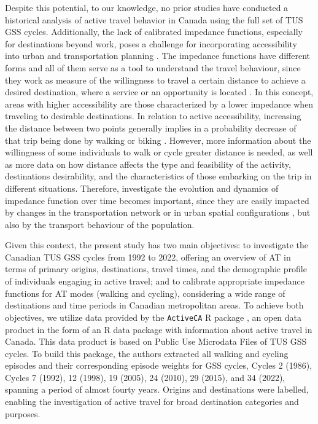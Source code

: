 \documentclass[preprint, 3p,
authoryear]{elsarticle} %
\begin{document}
Despite this potential, to our knowledge, no prior studies have
conducted a historical analysis of active travel behavior in Canada
using the full set of TUS GSS cycles. Additionally, the lack of
calibrated impedance functions, especially for destinations beyond work,
poses a challenge for incorporating accessibility into urban and
transportation planning \citep{pereira2023}. The impedance functions
have different forms and all of them serve as a tool to understand the
travel behaviour, since they work as measure of the willingness to
travel a certain distance to achieve a desired destination, where a
service or an opportunity is located
\citep{papa2012gravity, yang2012walking, millward2013active, vale2017influence}.
In this concept, areas with higher accessibility are those characterized
by a lower impedance when traveling to desirable destinations. In
relation to active accessibility, increasing the distance between two
points generally implies in a probability decrease of that trip being
done by walking or biking
\citep{hansen1959, geurs2001accessibility, geurs2004, levinson2005access, cascetta2013new}.
However, more information about the willingness of some individuals to
walk or cycle greater distance is needed, as well as more data on how
distance affects the type and feasibility of the activity, destinations
desirability, and the characteristics of those embarking on the trip in
different situations. Therefore, investigate the evolution and dynamics
of impedance function over time becomes important, since they are easily
impacted by changes in the transportation network or in urban spatial
configurations \citep{iacono2008access, iacono2010}, but also by the
transport behaviour of the population.

Given this context, the present study has two main objectives: to
investigate the Canadian TUS GSS cycles from 1992 to 2022, offering an
overview of AT in terms of primary origins, destinations, travel times,
and the demographic profile of individuals engaging in active travel;
and to calibrate appropriate impedance functions for AT modes (walking
and cycling), considering a wide range of destinations and time periods
in Canadian metropolitan areas. To achieve both objectives, we utilize
data provided by the \texttt{ActiveCA} R package \citep{dossantos2025},
an open data product in the form of an R data package with information
about active travel in Canada. This data product is based on Public Use
Microdata Files of TUS GSS cycles. To build this package, the authors
extracted all walking and cycling episodes and their corresponding
episode weights for GSS cycles, Cycles 2 (1986), Cycles 7 (1992), 12
(1998), 19 (2005), 24 (2010), 29 (2015), and 34 (2022), spanning a
period of almost fourty years. Origins and destinations were labelled,
enabling the investigation of active travel for broad destination
categories and purposes.
\end{document}
